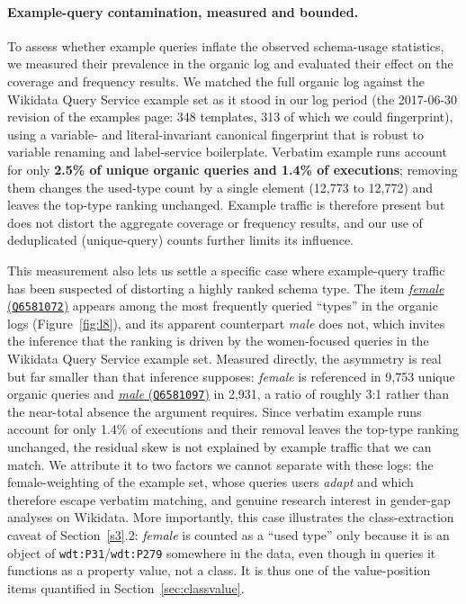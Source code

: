 \documentclass[sw]{iosart2x}
\begin{document}
\paragraph{\textbf{Example-query contamination, measured and bounded.}} To assess whether example queries inflate the observed schema-usage statistics, we measured their prevalence in the organic log and evaluated their effect on the coverage and frequency results. We matched the full organic log against the Wikidata Query Service example set as it stood in our log period (the 2017-06-30 revision of the examples page: 348 templates, 313 of which we could fingerprint), using a variable- and literal-invariant canonical fingerprint that is robust to variable renaming and label-service boilerplate. Verbatim example runs account for only \textbf{2.5\% of unique organic queries and 1.4\% of executions}; removing them changes the used-type count by a single element (12,773 to 12,772) and leaves the top-type ranking unchanged. Example traffic is therefore present but does not distort the aggregate coverage or frequency results, and our use of deduplicated (unique-query) counts further limits its influence.

This measurement also lets us settle a specific case where example-query traffic has been suspected of distorting a highly ranked schema type. The item \href{https://www.wikidata.org/wiki/Q6581072}{\emph{female} (\texttt{Q6581072})} appears among the most frequently queried ``types'' in the organic logs (Figure~\ref{fig:l8}), and its apparent counterpart \emph{male} does not, which invites the inference that the ranking is driven by the women-focused queries in the Wikidata Query Service example set. Measured directly, the asymmetry is real but far smaller than that inference supposes: \emph{female} is referenced in 9,753 unique organic queries and \href{https://www.wikidata.org/wiki/Q6581097}{\emph{male} (\texttt{Q6581097})} in 2,931, a ratio of roughly 3:1 rather than the near-total absence the argument requires. Since verbatim example runs account for only 1.4\% of executions and their removal leaves the top-type ranking unchanged, the residual skew is not explained by example traffic that we can match. We attribute it to two factors we cannot separate with these logs: the female-weighting of the example set, whose queries users \emph{adapt} and which therefore escape verbatim matching, and genuine research interest in gender-gap analyses on Wikidata. More importantly, this case illustrates the class-extraction caveat of Section~\ref{s3}.2: \emph{female} is counted as a ``used type'' only because it is an object of \texttt{wdt:P31}/\texttt{wdt:P279} somewhere in the data, even though in queries it functions as a property value, not a class. It is thus one of the value-position items quantified in Section~\ref{sec:classvalue}.
\end{document}
